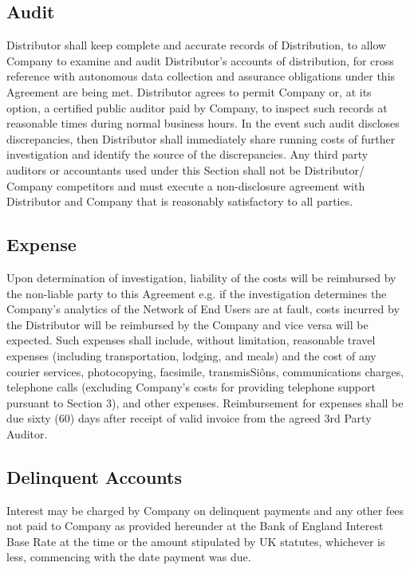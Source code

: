 \documentclass[letterpaper,10pt,openany,oneside,english]{sphinxmanual}
\begin{document}
\subsection{Audit}
\label{\detokenize{licencefees:audit}}
Distributor shall keep complete and accurate records of Distribution, to allow Company to examine and audit Distributor’s accounts of distribution, for cross reference with autonomous data collection and assurance obligations under this Agreement are being met. Distributor agrees to permit Company or, at its option, a certified public auditor paid by Company, to inspect such records at reasonable times during normal business hours. In the event such audit discloses discrepancies, then Distributor shall immediately share running costs of further investigation and identify the source of the discrepancies. Any third party auditors or accountants used under this Section shall not be Distributor/ Company competitors and must execute a non-disclosure agreement with Distributor and Company that is reasonably satisfactory to all parties.


\subsection{Expense}
\label{\detokenize{licencefees:expense}}
Upon determination of investigation, liability of the costs will be reimbursed by the non-liable party to this Agreement e.g. if the investigation determines the Company’s analytics of the Network of End Users are at fault, costs incurred by the Distributor will be reimbursed by the Company and vice versa will be expected. Such expenses shall include, without limitation, reasonable travel expenses (including transportation, lodging, and meals) and the cost of any courier services, photocopying, facsimile, transmisSiôns, communications charges, telephone calls (excluding Company’s costs for providing telephone support pursuant to Section 3), and other expenses.  Reimbursement for expenses shall be due sixty (60) days after receipt of valid invoice from the agreed 3rd Party Auditor.


\subsection{Delinquent Accounts}
\label{\detokenize{licencefees:delinquent-accounts}}
Interest may be charged by Company on delinquent payments and any other fees not paid to Company as provided hereunder at the Bank of England Interest Base Rate at the time or the amount stipulated by UK statutes, whichever is less, commencing with the date payment was due.
\end{document}
